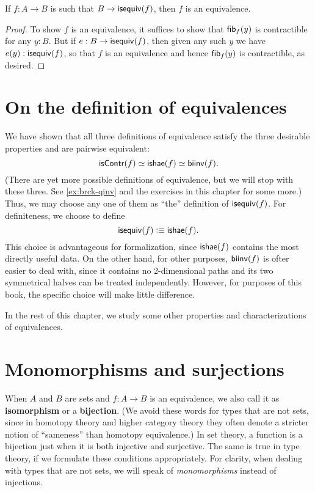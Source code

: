 \begin{cor}\label{thm:equiv-inhabcod}
  If $f:A\to B$ is such that $B\to \mathsf{isequiv}(f)$, then $f$ is an equivalence.
\end{cor}
\begin{proof}
  To show $f$ is an equivalence, it suffices to show that ${\mathsf{fib}}_{f}(y)$ is contractible for any $y:B$.
  But if $e:B\to \mathsf{isequiv}(f)$, then given any such $y$ we have $e(y):\mathsf{isequiv}(f)$, so that $f$ is an equivalence and hence ${\mathsf{fib}}_{f}(y)$ is contractible, as desired.
\end{proof}


\section{On the definition of equivalences}
\label{sec:concluding-remarks}

We have shown that all three definitions of equivalence satisfy the three desirable properties and are pairwise equivalent:
\[ \mathsf{isContr}(f) \simeq \mathsf{ishae}(f) \simeq \mathsf{biinv}(f) . \]
(There are yet more possible definitions of equivalence, but we will stop with these three.
See \autoref{ex:brck-qinv} and the exercises in this chapter for some more.)
Thus, we may choose any one of them as ``the'' definition of $\mathsf{isequiv} (f)$.
For definiteness, we choose to define
\[ \mathsf{isequiv}(f) \vcentcolon\equiv \mathsf{ishae}(f).\]
This choice is advantageous for formalization, since $\mathsf{ishae}(f)$ contains the most directly useful data.
On the other hand, for other purposes, $\mathsf{biinv}(f)$ is ofter easier to deal with, since it contains no 2-dimensional paths and its two symmetrical halves can be treated independently.
However, for purposes of this book, the specific choice will make little difference.

In the rest of this chapter, we study some other properties and characterizations of equivalences.


\section{Monomorphisms and surjections}
\label{sec:mono-surj}

When $A$ and $B$ are sets and $f:A\to B$ is an equivalence, we also call it as \textbf{isomorphism} or a \textbf{bijection}.
(We avoid these words for types that are not sets, since in homotopy theory and higher category theory they often denote a stricter notion of ``sameness'' than homotopy equivalence.)
In set theory, a function is a bijection just when it is both injective and surjective.
The same is true in type theory, if we formulate these conditions appropriately.
For clarity, when dealing with types that are not sets, we will speak of \emph{monomorphisms} instead of injections.


